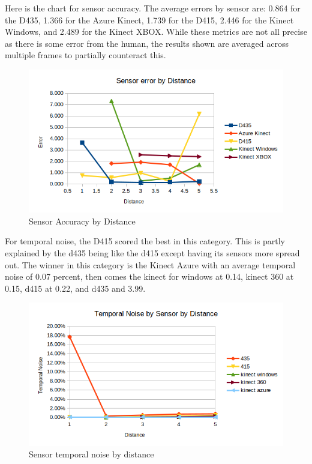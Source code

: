 Here is the chart for sensor accuracy. The average errors by sensor are: 0.864 for the D435, 1.366 for the Azure Kinect, 1.739 for the D415, 2.446 for the Kinect Windows, and 2.489 for the Kinect XBOX. While these metrics are not all precise as there is some error from the human, the results shown are averaged across multiple frames to partially counteract this.
\begin{figure}[h]
	\caption{Sensor Accuracy by Distance}
	\centering
	\includegraphics{images/sensor_accuracy.png}
\end{figure}

For temporal noise, the D415 scored the best in this category. This is partly explained by the d435 being like the d415 except having its sensors more spread out. The winner in this category is the Kinect Azure with an average temporal noise of 0.07 percent, then comes the kinect for windows at 0.14, kinect 360 at 0.15, d415 at 0.22, and d435 and 3.99.
\begin{figure}[h]
	\caption{Sensor temporal noise by distance}
	\centering
	\includegraphics{images/temporal_noise.png}
\end{figure}

